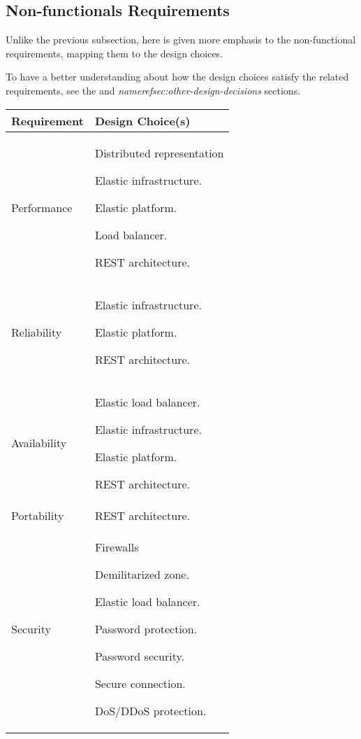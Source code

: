 \subsection{Non-functionals Requirements}

Unlike the previous subsection, here is given more emphasis to the non-functional requirements, mapping them to the design choices.

To have a better understanding about how the design choices satisfy the related requirements, see the \textit{} and \textit{nameref{sec:other-design-decisions}} sections.

\begin{longtable}{ |l|p{10cm}| }
	\hline
	\textbf{Requirement} & \textbf{Design Choice(s)}\\ \hline
	Performance & Distributed representation

Elastic infrastructure.

Elastic platform.

Load balancer.

REST architecture.\\ \hline

	Reliability & Elastic infrastructure.

Elastic platform.

REST architecture.\\ \hline
	Availability & Elastic load balancer.

Elastic infrastructure.

Elastic platform.

REST architecture.\\ \hline
	Portability & REST architecture.\\ \hline
	Security & Firewalls

Demilitarized zone.

Elastic load balancer.

Password protection.

Password security.

Secure connection.

DoS/DDoS protection.
\\ \hline
\end{longtable}
